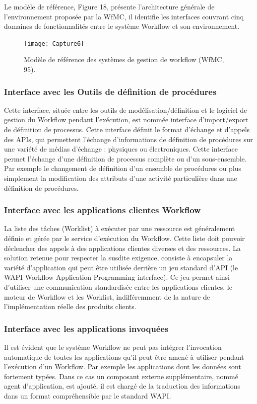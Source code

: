 Le modèle de référence, Figure 18, présente l’architecture générale de l’environnement
proposée par la WfMC, il identifie les interfaces couvrant cinq domaines de fonctionnalités entre le système Workflow et son environnement. 

\begin{figure}[h]
	\centering
	\texttt{[image: Capture6]}
	\caption{ Modèle de référence des systèmes de gestion de workflow (WfMC, 95). }
	\label{fig:capture6}
\end{figure}


\subsubsection{Interface avec les Outils de définition de procédures }
Cette interface, située entre les outils de modélisation/définition et le logiciel de gestion
du Workflow pendant l’exécution, est nommée interface d’import/export de définition de processus. Cette interface définit le format d’échange et d’appels des APIs, qui permettent
l'échange d'informations de définition de procédures sur une variété de médias d'échange :
physiques ou électroniques. Cette interface permet l'échange d'une définition de processus
complète ou d’un sous-ensemble. Par exemple le changement de définition d’un ensemble de
procédures ou plus simplement la modification des attributs d'une activité particulière dans
une définition de procédures. 

\subsubsection{Interface avec les applications clientes Workflow }
La liste des tâches (Worklist) à exécuter par une ressource est généralement définie et gérée par le service d’exécution du Workflow. Cette liste doit pouvoir déclencher des appels à
des applications clientes diverses et des ressources. La solution retenue pour respecter la susdite exigence, consiste à encapsuler la variété d’application qui peut être utilisée derrière un jeu standard d'API (le WAPI Workflow Application Programming interface). Ce jeu permet ainsi d’utiliser une communication standardisée entre les applications clientes, le moteur de Workflow et les Worklist, indifféremment de la nature de l’implémentation réelle des produits
clients. 
\subsubsection{Interface avec les applications invoquées}
Il est évident que le système Workflow ne peut pas intégrer l’invocation automatique de
toutes les applications qu’il peut être amené à utiliser pendant l’exécution d’un Workflow. Par
exemple les applications dont les données sont fortement typées. Dans ce cas un composant
externe supplémentaire, nommé agent d’application, est ajouté, il est chargé de la traduction
des informations dans un format compréhensible par le standard WAPI. 

